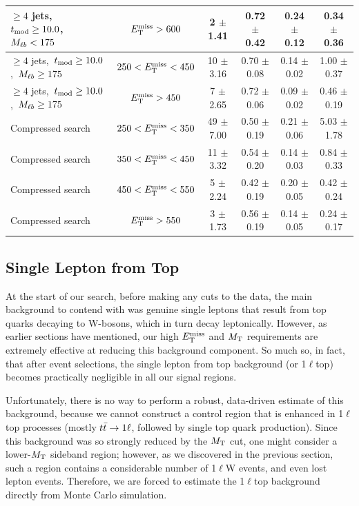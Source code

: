 \begin{table}
\begin{tabular}{|l|c|c|c|c|c|}
 $\ge4$ jets,~$t_\text{mod} \ge10.0$,~$M_{\ell b} <175$      & $E_\text{T}^\text{miss}>600$     & 2 $\pm$ 1.41    & 0.72 $\pm$ 0.42  & 0.24 $\pm$ 0.12 & 0.34 $\pm$ 0.36 \\
\hline
 $\ge4$ jets,~$t_\text{mod} \ge10.0$,~$M_{\ell b} \ge175$    & $250<E_\text{T}^\text{miss}<450$ & 10 $\pm$ 3.16   & 0.70 $\pm$ 0.08  & 0.14 $\pm$ 0.02 & 1.00 $\pm$ 0.37 \\
 $\ge4$ jets,~$t_\text{mod} \ge10.0$,~$M_{\ell b} \ge175$    & $E_\text{T}^\text{miss}>450$     & 7 $\pm$ 2.65    & 0.72 $\pm$ 0.06  & 0.09 $\pm$ 0.02 & 0.46 $\pm$ 0.19 \\
\hline
Compressed search & $250<E_\text{T}^\text{miss}<350$  & 49 $\pm$ 7.00  & 0.50 $\pm$ 0.19  & 0.21 $\pm$ 0.06  & 5.03 $\pm$ 1.78  \\
Compressed search & $350<E_\text{T}^\text{miss}<450$  & 11 $\pm$ 3.32  & 0.54 $\pm$ 0.20  & 0.14 $\pm$ 0.03  & 0.84 $\pm$ 0.33  \\
Compressed search & $450<E_\text{T}^\text{miss}<550$  & 5 $\pm$ 2.24   & 0.42 $\pm$ 0.19  & 0.20 $\pm$ 0.05  & 0.42 $\pm$ 0.24  \\
Compressed search & $E_\text{T}^\text{miss}>550$      & 3 $\pm$ 1.73  & 0.56 $\pm$ 0.19  & 0.14 $\pm$ 0.05  & 0.24 $\pm$ 0.17  \\
\hline
\end{tabular}
\end{table}

\subsection{Single Lepton from Top}
\label{ssec:stop:1ltop}

At the start of our search, before making any cuts to the data, the
main background to contend with was genuine single leptons that result
from top quarks decaying to W-bosons, which in turn decay
leptonically. However, as earlier sections have mentioned, our high
$E_\text{T}^\text{miss}$ and $M_\text{T}$ requirements are extremely effective at reducing this
background component. So much so, in fact, that after event
selections, the single lepton from top background (or 1$\ell$top) becomes
practically negligible in all our signal regions.

Unfortunately, there is no way to perform a robust, data-driven
estimate of this background, because we cannot construct a control
region that is enhanced in 1$\ell$top processes (mostly $t\bar{t} \rightarrow 1\ell$,
followed by single top quark production). Since this background was so
strongly reduced by the $M_\text{T}$ cut, one might consider a lower-$M_\text{T}$
sideband region; however, as we discovered in the previous section,
such a region contains a considerable number of 1$\ell$W events, and
even lost lepton events. Therefore, we are forced to estimate the
1$\ell$top background directly from Monte Carlo simulation.

